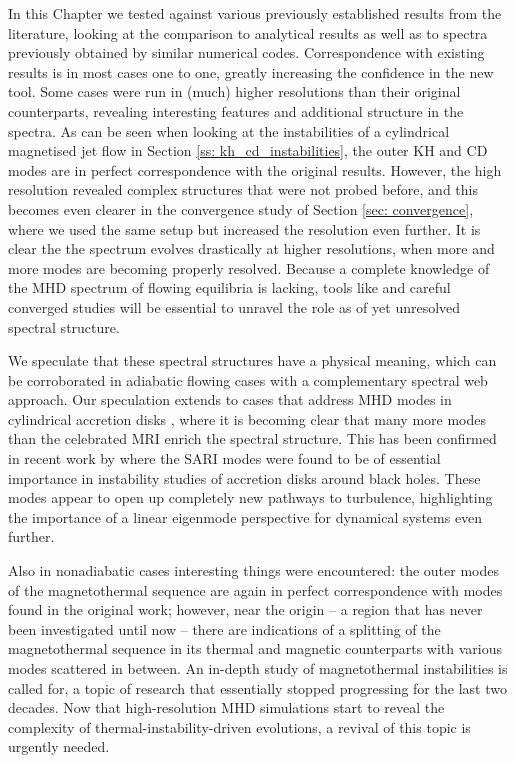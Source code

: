 In this Chapter we tested {\legolas} against various previously established results from the literature, looking at the comparison to analytical results as well as to spectra previously obtained by similar numerical codes. Correspondence with existing results is in most cases one to one, greatly increasing the confidence in the new tool. Some cases were run in (much) higher resolutions than their original counterparts, revealing interesting features and additional structure in the spectra. As can be seen when looking at the instabilities of a cylindrical magnetised jet flow in Section \ref{ss: kh_cd_instabilities}, the outer KH and CD modes are in perfect correspondence with the original results. However, the high resolution revealed complex structures that were not probed before, and this becomes even clearer in the convergence study of Section \ref{sec: convergence}, where we used the same setup but increased the resolution even further. It is clear the the spectrum evolves drastically at higher resolutions, when more and more modes are becoming properly resolved. Because a complete knowledge of the MHD spectrum of flowing equilibria is lacking, tools like {\legolas} and careful converged studies will be essential to unravel the role as of yet unresolved spectral structure.

We speculate that these spectral structures have a physical meaning, which can be corroborated in adiabatic flowing cases with a complementary spectral web approach. Our speculation extends to cases that address MHD modes in cylindrical accretion disks \citep{keppens2002}, where it is becoming clear that many more modes than the celebrated MRI enrich the spectral structure. This has been confirmed in recent work by \citet{goedbloed2022_sari} where the SARI modes were found to be of essential importance in instability studies of accretion disks around black holes. These modes appear to open up completely new pathways to turbulence, highlighting the importance of a linear eigenmode perspective for dynamical systems even further.

Also in nonadiabatic cases interesting things were encountered: the outer modes of the magnetothermal sequence are again in perfect correspondence with modes found in the original work; however, near the origin -- a region that has never been investigated until now -- there are indications of a splitting of the magnetothermal sequence in its thermal and magnetic counterparts with various modes scattered in between. An in-depth study of magnetothermal instabilities is called for, a topic of research that essentially stopped progressing for the last two decades. Now that high-resolution MHD simulations start to reveal the complexity of thermal-instability-driven evolutions, a revival of this topic is urgently needed.


